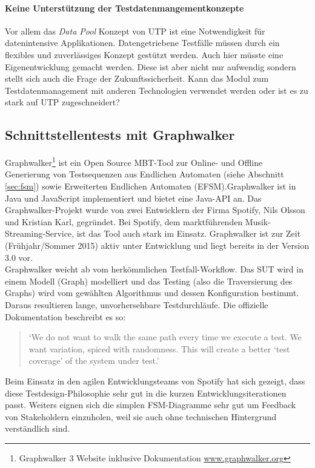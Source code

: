 \paragraph{Keine Unterstützung der Testdatenmangementkonzepte}
Vor allem das \textit{Data Pool} Konzept von UTP ist eine Notwendigkeit für datenintensive Applikationen. Datengetriebene Testfälle müssen durch ein flexibles und zuverlässiges Konzept gestützt werden. Auch hier müsste eine Eigenentwicklung gemacht werden. Diese ist aber nicht nur aufwendig sondern stellt sich auch die Frage der Zukunftssicherheit. Kann das Modul zum Testdatenmanagement mit anderen Technologien verwendet werden oder ist es zu stark auf UTP zugeschneidert?

\subsection{Schnittstellentests mit Graphwalker}
Graphwalker\footnote{Graphwalker 3 Website inklusive Dokumentation \url{www.graphwalker.org}} ist ein Open Source MBT-Tool zur Online- und Offline Generierung von Testsequenzen aus Endlichen Automaten (siehe Abschnitt \ref{sec:fsm}) sowie Erweiterten Endlichen Automaten (EFSM).Graphwalker ist in Java und JavaScript implementiert und bietet eine Java-API an. Das Graphwalker-Projekt wurde von zwei Entwicklern der Firma Spotify, Nils Olsson und Kristian Karl, gegründet. Bei Spotify, dem marktführenden Musik-Streaming-Service, ist das Tool auch stark im Einsatz. Graphwalker ist zur Zeit (Frühjahr/Sommer 2015) aktiv unter Entwicklung und liegt bereits in der Version 3.0 vor.\\
Graphwalker weicht ab vom herkömmlichen Testfall-Workflow. Das SUT wird in einem Modell (Graph) modelliert und das Testing (also die Traversierung des Graphs) wird vom gewählten Algorithmus und dessen Konfiguration bestimmt. Daraus resultieren lange, unvorhersehbare Testdurchläufe. Die offizielle Dokumentation beschreibt es so:

\begin{quote}
`We do not want to walk the same path every time we execute a test. We want variation, spiced with randomness. This will create a better `test coverage' of the system under test.'\cite{_graphwalker_2015}
\end{quote}

Beim Einsatz in den agilen Entwicklungsteams von Spotify hat sich gezeigt, dass diese Testdesign-Philosophie sehr gut in die kurzen Entwicklungsiterationen passt. Weiters eignen sich die simplen FSM-Diagramme sehr gut um Feedback von Stakeholdern einzuholen, weil sie auch ohne technischen Hintergrund verständlich sind.

